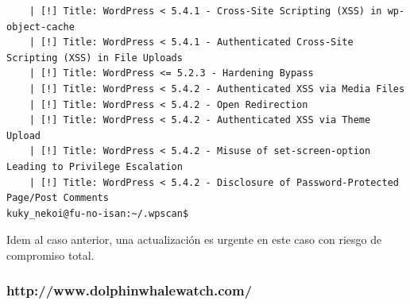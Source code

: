 \documentclass[11pt]{utalcaDoc}
\begin{document}
\begin{verbatim}
	| [!] Title: WordPress < 5.4.1 - Cross-Site Scripting (XSS) in wp-object-cache
	| [!] Title: WordPress < 5.4.1 - Authenticated Cross-Site Scripting (XSS) in File Uploads
	| [!] Title: WordPress <= 5.2.3 - Hardening Bypass
	| [!] Title: WordPress < 5.4.2 - Authenticated XSS via Media Files
	| [!] Title: WordPress < 5.4.2 - Open Redirection
	| [!] Title: WordPress < 5.4.2 - Authenticated XSS via Theme Upload
	| [!] Title: WordPress < 5.4.2 - Misuse of set-screen-option Leading to Privilege Escalation
	| [!] Title: WordPress < 5.4.2 - Disclosure of Password-Protected Page/Post Comments
kuky_nekoi@fu-no-isan:~/.wpscan$ 	
\end{verbatim}

Idem al caso anterior, una actualización es urgente en este caso con riesgo de compromiso total.


\subsubsection{http://www.dolphinwhalewatch.com/}
\end{document}
